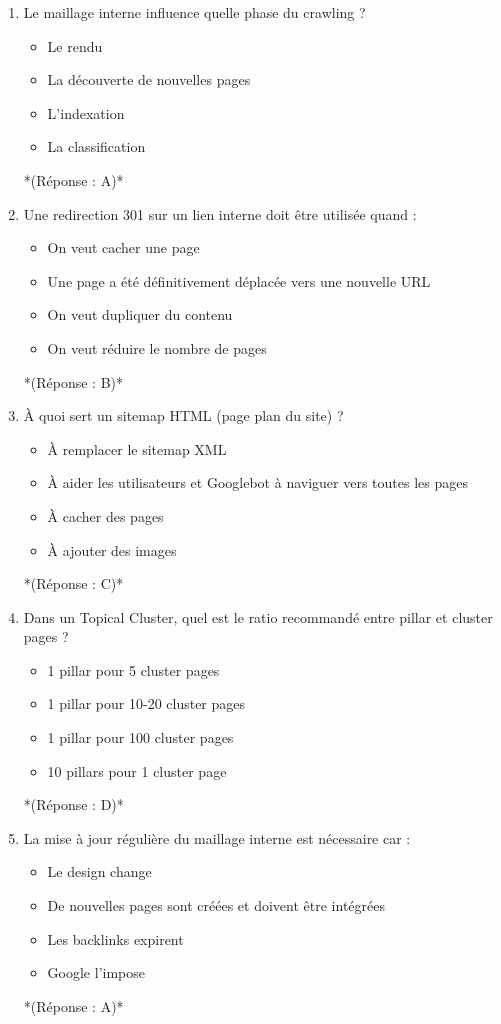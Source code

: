 \documentclass[12pt,a4paper,twoside]{report}
\begin{document}
\begin{enumerate}
\item Le maillage interne influence quelle phase du crawling ?
\begin{itemize}
\item[A)] Le rendu
\item[B)] La découverte de nouvelles pages
\item[C)] L'indexation
\item[D)] La classification
\end{itemize}
*(Réponse : A)*

\item Une redirection 301 sur un lien interne doit être utilisée quand :
\begin{itemize}
\item[A)] On veut cacher une page
\item[B)] Une page a été définitivement déplacée vers une nouvelle URL
\item[C)] On veut dupliquer du contenu
\item[D)] On veut réduire le nombre de pages
\end{itemize}
*(Réponse : B)*

\item À quoi sert un sitemap HTML (page plan du site) ?
\begin{itemize}
\item[A)] À remplacer le sitemap XML
\item[B)] À aider les utilisateurs et Googlebot à naviguer vers toutes les pages
\item[C)] À cacher des pages
\item[D)] À ajouter des images
\end{itemize}
*(Réponse : C)*

\item Dans un Topical Cluster, quel est le ratio recommandé entre pillar et cluster pages ?
\begin{itemize}
\item[A)] 1 pillar pour 5 cluster pages
\item[B)] 1 pillar pour 10-20 cluster pages
\item[C)] 1 pillar pour 100 cluster pages
\item[D)] 10 pillars pour 1 cluster page
\end{itemize}
*(Réponse : D)*

\item La mise à jour régulière du maillage interne est nécessaire car :
\begin{itemize}
\item[A)] Le design change
\item[B)] De nouvelles pages sont créées et doivent être intégrées
\item[C)] Les backlinks expirent
\item[D)] Google l'impose
\end{itemize}
*(Réponse : A)*
\end{enumerate}
\end{document}
